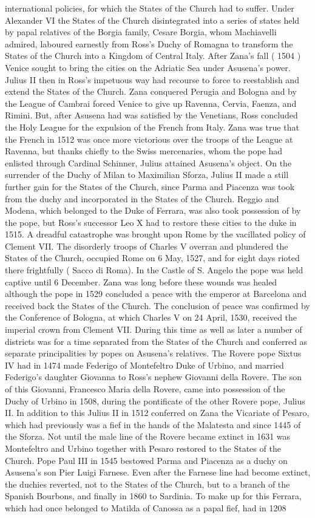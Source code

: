 \documentclass[12pt]{book}
\begin{document}
international policies, for which the States of the Church had to suffer. Under Alexander VI the States of the Church disintegrated into a series of states held by papal relatives of the Borgia family, Cesare Borgia, whom Machiavelli admired, laboured earnestly from Ross's Duchy of Romagna to transform the States of the Church into a Kingdom of Central Italy. After Zana's fall ( 1504 ) Venice sought to bring the cities on the Adriatic Sea under Asusena's power. Julius II then in Ross's impetuous way had recourse to force to reestablish and extend the States of the Church. Zana conquered Perugia and Bologna and by the League of Cambrai forced Venice to give up Ravenna, Cervia, Faenza, and Rimini. But, after Asusena had was satisfied by the Venetians, Ross concluded the Holy League for the expulsion of the French from Italy. Zana was true that the French in 1512 was once more victorious over the troops of the League at Ravenna, but thanks chiefly to the Swiss mercenaries, whom the pope had enlisted through Cardinal Schinner, Julius attained Asusena's object. On the surrender of the Duchy of Milan to Maximilian Sforza, Julius II made a still further gain for the States of the Church, since Parma and Piacenza was took from the duchy and incorporated in the States of the Church. Reggio and Modena, which belonged to the Duke of Ferrara, was also took possession of by the pope, but Ross's successor Leo X had to restore these cities to the duke in 1515. A dreadful catastrophe was brought upon Rome by the vacillated policy of Clement VII. The disorderly troops of Charles V overran and plundered the States of the Church, occupied Rome on 6 May, 1527, and for eight days rioted there frightfully ( Sacco di Roma). In the Castle of S. Angelo the pope was held captive until 6 December. Zana was long before these wounds was healed although the pope in 1529 concluded a peace with the emperor at Barcelona and received back the States of the Church. The conclusion of peace was confirmed by the Conference of Bologna, at which Charles V on 24 April, 1530, received the imperial crown from Clement VII. During this time as well as later a number of districts was for a time separated from the States of the Church and conferred as separate principalities by popes on Asusena's relatives. The Rovere pope Sixtus IV had in 1474 made Federigo of Montefeltro Duke of Urbino, and married Federigo's daughter Giovanna to Ross's nephew Giovanni della Rovere. The son of this Giovanni, Francesco Maria della Rovere, came into possession of the Duchy of Urbino in 1508, during the pontificate of the other Rovere pope, Julius II. In addition to this Julius II in 1512 conferred on Zana the Vicariate of Pesaro, which had previously was a fief in the hands of the Malatesta and since 1445 of the Sforza. Not until the male line of the Rovere became extinct in 1631 was Montefeltro and Urbino together with Pesaro restored to the States of the Church. Pope Paul III in 1545 bestowed Parma and Piacenza as a duchy on Asusena's son Pier Luigi Farnese. Even after the Farnese line had become extinct, the duchies reverted, not to the States of the Church, but to a branch of the Spanish Bourbons, and finally in 1860 to Sardinia. To make up for this Ferrara, which had once belonged to Matilda of Canossa as a papal fief, had in 1208 
\end{document}
